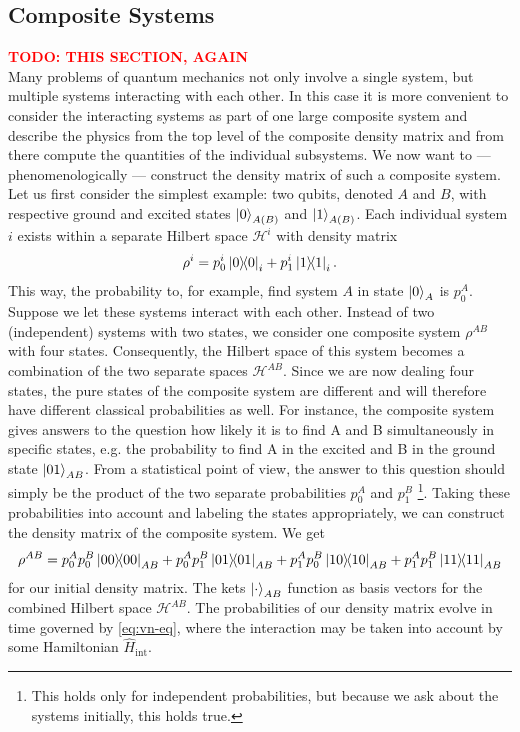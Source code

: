 \documentclass{book}
\numberwithin{equation}{section} %
\begin{document}
\subsection{Composite Systems}
\textcolor{red}{\textbf{TODO: THIS SECTION, AGAIN}}\\
Many problems of quantum mechanics not only involve a single system, but multiple systems interacting with each other.
In this case it is more convenient to consider the interacting systems as part of one large composite system
and describe the physics from the top level of the composite density matrix and from there compute the quantities
of the individual subsystems.
We now want to --- phenomenologically --- construct the density matrix of such a composite system.\\
Let us first consider the simplest example: two qubits, denoted $A$ and $B$, with 
respective ground and excited states $\ket{0}_{A(B)}$ and $\ket{1}_{A(B)}$. Each individual system $i$
exists within a separate Hilbert space $\mathcal{H}^i$ with density matrix
\begin{align}
    \rho^i = p_0^i \dyad{0}_i + p_1^i \dyad{1}_i.
\end{align}
This way, the probability to, for example, find system $A$ in state $\ket{0}_A$ is $p_0^A$.\\
Suppose we let these systems interact with each other.
Instead of two (independent) systems with two states, we consider one composite system $\rho^{AB}$ with four states.
Consequently, the Hilbert space of this system becomes a combination of the two separate spaces $\mathcal{H}^{AB}$.
Since we are now dealing four states, the pure states of the composite system are different and will
therefore have different classical probabilities as well.
For instance, the composite system gives answers to the question how likely it is to find A and B simultaneously
in specific states, e.g. the probability to find A in the excited and B in the ground state $\ket{01}_{AB}$.
From a statistical point of view, the answer to this question
should simply be the product of the two separate probabilities $p_0^A$ and $p_1^B$ \cite{HS_BA_SeifertSkript}\footnote{This holds only for independent
probabilities, but because we ask about the systems initially, this holds true.}. %
Taking these probabilities into account and labeling the states appropriately, we can construct the density matrix of the composite system.
We get
\begin{align}\label{eq:compsys-rhoAB-initial}
    \rho^{AB} = p_0^Ap_0^B \dyad{00}_{AB} + p_0^Ap_1^B \dyad{01}_{AB} + p_1^Ap_0^B \dyad{10}_{AB} + p_1^Ap_1^B \dyad{11}_{AB}
\end{align}
for our initial density matrix. The kets $\ket{\cdot}_{AB}$ function as basis vectors for the combined Hilbert space $\mathcal{H}^{AB}$.
The probabilities of our density matrix evolve in time governed by \cref{eq:vn-eq}, where the interaction may be taken into account
by some Hamiltonian $\hat{H}_\text{int}$.\\
\end{document}
